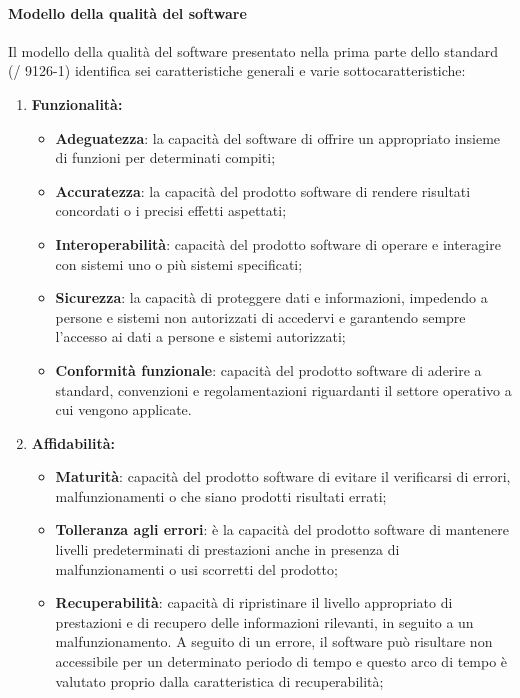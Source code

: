  \paragraph{Modello della qualità del software}
  Il modello della qualità del software presentato nella prima parte dello standard (/ 9126-1) identifica sei caratteristiche generali e varie sottocaratteristiche:
  \begin{enumerate}
    \item \textbf{Funzionalità:}
    \begin{itemize}
        \item \textbf{Adeguatezza}: la capacità del software di offrire un appropriato insieme di funzioni per determinati compiti;
        \item \textbf{Accuratezza}: la capacità del prodotto software di rendere risultati concordati o i precisi effetti aspettati;
        \item \textbf{Interoperabilità}: capacità del prodotto software di operare e interagire con sistemi uno o più sistemi specificati;
        \item \textbf{Sicurezza}: la capacità di proteggere dati e informazioni, impedendo a persone e sistemi non autorizzati di accedervi e garantendo sempre l'accesso ai dati a persone e sistemi autorizzati;
        \item \textbf{Conformità funzionale}: capacità del prodotto software di aderire a standard, convenzioni e regolamentazioni riguardanti il settore operativo a cui vengono applicate.
    \end{itemize}
    \item \textbf{Affidabilità:}
    \begin{itemize}
      \item \textbf{Maturità}: capacità del prodotto software di evitare il verificarsi di errori, malfunzionamenti o che siano prodotti risultati errati;
      \item \textbf{Tolleranza agli errori}: è la capacità del prodotto software di mantenere livelli predeterminati di prestazioni anche in presenza di malfunzionamenti o usi scorretti del prodotto;
      \item \textbf{Recuperabilità}: capacità di ripristinare il livello appropriato di prestazioni e di recupero delle informazioni rilevanti, in seguito a un malfunzionamento.
      A seguito di un errore, il software può risultare non accessibile per un determinato periodo di tempo e questo arco di tempo è valutato proprio dalla caratteristica di recuperabilità;

\end{itemize}
\end{enumerate}

